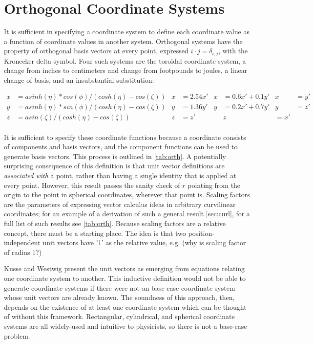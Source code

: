 \documentclass{article}
\begin{document}
\section*{Orthogonal Coordinate Systems}

It is sufficient in specifying a coordinate system to define each coordinate value as a function of coordinate values in another system. Orthogonal systems have the property of orthogonal basis vectors at every point, expressed $\unit{i} \cdot \unit{j} = \delta_{i,j}$, with the Kronecker delta symbol. Four such systems are the toroidal coordinate system, a change from inches to centimeters and change from footpounds to joules, a linear change of basis, and an insubstantial substitution:

\begin{align*}
x &= a sinh(\eta) * cos(\phi) / (cosh(\eta) - cos(\zeta)) & x &= 2.54 x'  & x &= 0.6 x' + 0.1 y' & x &= y'\\
y &= a sinh(\eta) * sin(\phi) / (cosh(\eta) - cos(\zeta)) & y &= 1.36 y'  & y &= 0.2 x' + 0.7 y' & y &= z' \\
z &= a sin(\zeta) / (cosh(\eta) - cos(\zeta))             & z &= z'       &                      & z &= x' \\
\end{align*}

It is sufficient to specify these coordinate functions because a coordinate consists of components and basis vectors, and the component functions can be used to generate basis vectors. This process is outlined in \cref{tab:orth}. A potentially surprising consequence of this definition is that unit vector definitions are \textit{associated with} a point, rather than having a single identity that is applied at every point. However, this result passes the sanity check of $\unit{r}$ pointing from the origin to the point in spherical coordinates, wherever that point is. Scaling factors are the parameters of expressing vector calculus ideas in arbitrary curvilinear coordinates; for an example of a derivation of such a general result \cref{sec:curl}, for a full list of such results see \cref{tab:orth}. Because scaling factors are a relative concept, there must be a starting place. The idea is that two position-independent unit vectors have '1' as the relative value, e.g. (why is scaling factor of radius 1?)

Kusse and Westwig present the unit vectors as emerging from equations relating one coordinate system to another. This inductive definition would not be able to generate coordinate systems if there were not an base-case coordinate system whose unit vectors are already known. The soundness of this approach, then, depends on the existence of at least one coordinate system which can be thought of without this framework. Rectangular, cylindrical, and spherical coordinate systems are all widely-used and intuitive to physicists, so there is not a base-case problem.
\end{document}
